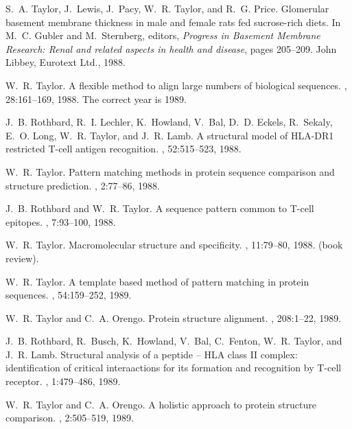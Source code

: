 \begin{thebibliography}{100}
S.~A. Taylor, J.~Lewis, J.~Pacy, W.~R. Taylor, and R.~G. Price.
\newblock Glomerular basement membrane thickness in male and female rats fed
  sucrose-rich diets.
\newblock In M.~C. Gubler and M.~Sternberg, editors, {\em Progress in Basement
  Membrane Research: Renal and related aspects in health and disease}, pages
  205--209. John Libbey, Eurotext Ltd., 1988.

W.~R. Taylor.
\newblock A flexible method to align large numbers of biological sequences.
, 28:161--169, 1988.
\newblock The correct year is 1989.

J.~B. Rothbard, R.~I. Lechler, K.~Howland, V.~Bal, D.~D. Eckels, R.~Sekaly,
  E.~O. Long, W.~R. Taylor, and J.~R. Lamb.
\newblock A structural model of {HLA-DR1} restricted {T}-cell antigen
  recognition.
, 52:515--523, 1988.

W.~R. Taylor.
\newblock Pattern matching methods in protein sequence comparison and structure
  prediction.
, 2:77--86, 1988.

J.~B. Rothbard and W.~R. Taylor.
\newblock A sequence pattern common to {T}-cell epitopes.
, 7:93--100, 1988.

W.~R. Taylor.
\newblock Macromolecular structure and specificity.
, 11:79--80, 1988.
\newblock (book review).

W.~R. Taylor.
\newblock A template based method of pattern matching in protein sequences.
, 54:159--252, 1989.

W.~R. Taylor and C.~A. Orengo.
\newblock Protein structure alignment.
, 208:1--22, 1989.

J.~B. Rothbard, R.~Busch, K.~Howland, V.~Bal, C.~Fenton, W.~R. Taylor, and
  J.~R. Lamb.
\newblock Structural analysis of a peptide -- {HLA} class {II} complex:
  identification of critical interaactions for its formation and recognition by
  {T}-cell receptor.
, 1:479--486, 1989.

W.~R. Taylor and C.~A. Orengo.
\newblock A holistic approach to protein structure comparison.
, 2:505--519, 1989.


\end{thebibliography}
